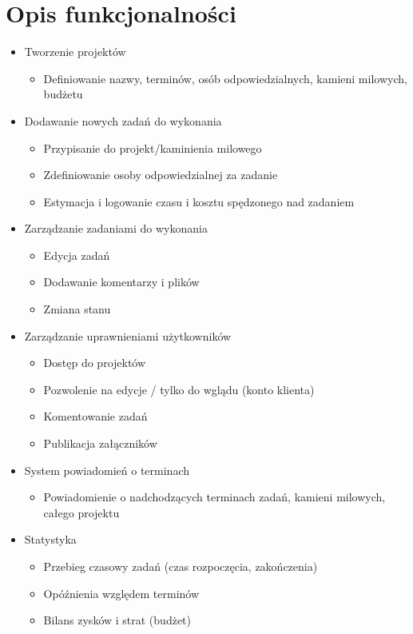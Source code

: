 \documentclass[wide,a4paper,titlepage,12pt] {article}
\begin{document}
\section{Opis funkcjonalności}
  \begin{itemize}
    \item Tworzenie projektów
      \begin{itemize}
        \item Definiowanie nazwy, terminów, osób odpowiedzialnych, kamieni milowych, budżetu
      \end{itemize}

    \item Dodawanie nowych zadań do wykonania
      \begin{itemize}
        \item Przypisanie do projekt/kaminienia milowego
        \item Zdefiniowanie osoby odpowiedzialnej za zadanie
        \item Estymacja i logowanie czasu i kosztu spędzonego nad zadaniem
      \end{itemize}

   \item Zarządzanie zadaniami do wykonania
     \begin{itemize}
       \item Edycja zadań
       \item Dodawanie komentarzy i plików
       \item Zmiana stanu 
     \end{itemize}
     
    \item Zarządzanie uprawnieniami użytkowników
      \begin{itemize}
        \item Dostęp do projektów
        \item Pozwolenie na edycje / tylko do wglądu (konto klienta)
        \item Komentowanie zadań
        \item Publikacja załączników
      \end{itemize}

    \item System powiadomień o terminach
      \begin{itemize}
        \item Powiadomienie o nadchodzących terminach zadań, kamieni milowych, całego projektu
      \end{itemize}

    \item Statystyka
      \begin{itemize}
        \item Przebieg czasowy zadań (czas rozpoczęcia, zakończenia)
        \item Opóźnienia względem terminów
        \item Bilans zysków i strat (budżet)
      \end{itemize}

  \end{itemize}
\end{document}
